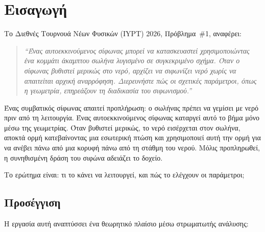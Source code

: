 \documentclass[11pt]{article}
\begin{document}
\tableofcontents
\newpage

\section{Εισαγωγή}
\label{sec:intro}

Το Διεθνές Τουρνουά Νέων Φυσικών (IYPT) 2026, Πρόβλημα~\#1, αναφέρει:
\begin{quote}
\emph{``Ένας αυτοεκκινούμενος σίφωνας μπορεί να κατασκευαστεί χρησιμοποιώντας ένα κομμάτι άκαμπτου σωλήνα λυγισμένο σε συγκεκριμένο σχήμα. Όταν ο σίφωνας βυθιστεί μερικώς στο νερό, αρχίζει να σιφωνίζει νερό χωρίς να απαιτείται αρχική αναρρόφηση. Διερευνήστε πώς οι σχετικές παράμετροι, όπως η γεωμετρία, επηρεάζουν τη διαδικασία του σιφωνισμού.''}
\end{quote}

Ένας συμβατικός σίφωνας απαιτεί προπλήρωση: ο σωλήνας πρέπει να γεμίσει με νερό πριν από τη λειτουργία. Ένας αυτοεκκινούμενος σίφωνας καταργεί αυτό το βήμα μόνο μέσω της γεωμετρίας. Όταν βυθιστεί μερικώς, το νερό εισέρχεται στον σωλήνα, αποκτά ορμή κατεβαίνοντας μια εσωτερική πτώση και χρησιμοποιεί αυτή την ορμή για να ανέβει πάνω από μια κορυφή πάνω από τη στάθμη του νερού. Μόλις προπληρωθεί, η συνηθισμένη δράση του σιφώνα αδειάζει το δοχείο.

Το ερώτημα είναι: τι το κάνει να λειτουργεί, και πώς το ελέγχουν οι παράμετροι;

\subsection{Προσέγγιση}

Η εργασία αυτή αναπτύσσει ένα θεωρητικό πλαίσιο μέσω στρωματωτής ανάλυσης:
\end{document}
